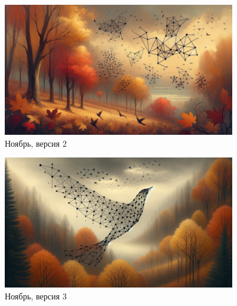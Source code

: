 \documentclass[a4paper,oneside,14pt]{extarticle}
\begin{document}

\begin{figure}[H]
	\centering
    \includegraphics[width=0.9\textwidth]{img/graphs-fly-to-the-south-1.png}
	\caption{Ноябрь, версия 2}
	\label{fig:}
\end{figure}

\begin{figure}[H]
	\centering
    \includegraphics[width=0.9\textwidth]{img/graphs-fly-to-the-south-2.png}
	\caption{Ноябрь, версия 3}
	\label{fig:}
\end{figure}

\end{document}
